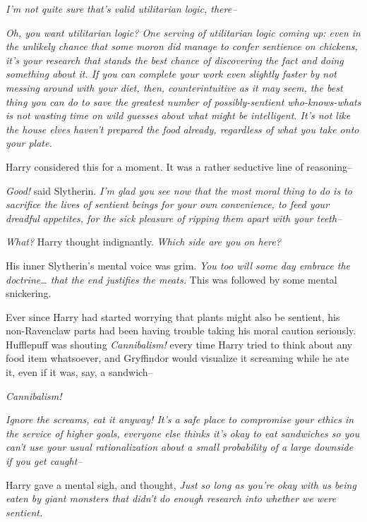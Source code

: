 \emph{I'm not quite sure that's valid utilitarian logic, there\---}

\emph{Oh, you want utilitarian logic? One serving of utilitarian logic coming up: even in the unlikely chance that some moron \emph{did} manage to confer sentience on chickens, it's \emph{your} research that stands the best chance of discovering the fact and doing something about it. If you can complete your work even slightly faster by \emph{not} messing around with your diet, then, counterintuitive as it may seem, the \emph{best} thing you can do to save the greatest number of possibly-sentient who-knows-whats is \emph{not} wasting time on wild guesses about what might be intelligent. It's not like the house elves haven't prepared the food already, regardless of what you take onto your plate.}

Harry considered this for a moment. It was a rather seductive line of reasoning\---

\emph{Good!} said Slytherin. \emph{I'm glad you see now that the most moral thing to do is to sacrifice the lives of sentient beings for your own convenience, to feed your dreadful appetites, for the sick pleasure of ripping them apart with your teeth\---}

\emph{What?} Harry thought indignantly. \emph{Which side are you \emph{on} here?}

His inner Slytherin's mental voice was grim. \emph{You too will some day embrace the doctrine{\ldots} that the end justifies the meats.} This was followed by some mental snickering.

Ever since Harry had started worrying that plants might also be sentient, his non-Ravenclaw parts had been having trouble taking his moral caution seriously. Hufflepuff was shouting \emph{Cannibalism!} every time Harry tried to think about any food item whatsoever, and Gryffindor would visualize it screaming while he ate it, even if it was, say, a sandwich\---

\emph{Cannibalism!}

\emph{}

\emph{Ignore the screams, eat it anyway! It's a safe place to compromise your ethics in the service of higher goals, everyone \emph{else} thinks it's okay to eat sandwiches so you can't use your usual rationalization about a small probability of a large downside if you get caught\---}

Harry gave a mental sigh, and thought, \emph{Just so long as you're okay with \emph{us} being eaten by giant monsters that didn't do enough research into whether \emph{we} were sentient.}

